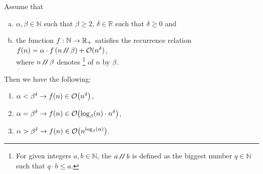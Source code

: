 \begin{Theorem} 
  Assume that 
  \begin{enumerate}[(a)]
  \item $\alpha,\beta \in \mathbb{N}$ such that  $\beta \geq 2$, $\delta \in \mathbb{R}$ such that $\delta \geq
    0$ and
  \item the function $f:{\mathbb N} \rightarrow {\mathbb R}_+$ satisfies the recurrence relation
        \\[0.2cm]
        \hspace*{1.3cm}
        $f(n) = \alpha \cdot f\left(n \mbox{\,\texttt{/}$\!$\texttt{/}\,} \beta\right) + \mathcal{O}(n^\delta)$,
        \\[0.2cm]
        where $n \mbox{\,\texttt{/}$\!$\texttt{/}\,} \beta$ denotes \footnote{
          For given integers $a, b \in \mathbb{N}$, the  $a \mbox{\,\texttt{/}$\!$\texttt{/}\,} b$
          is defined as the biggest number $q \in \mathbb{N}$ such that $q \cdot b \leq a$.  
        }  
        of $n$ by $\beta$.
  \end{enumerate}
  Then we have the following:
  \begin{enumerate}
  \item $\alpha < \beta^\delta\rightarrow f(n) \in \mathcal{O}\bigl(n^{\delta}\bigr)$,
  \item $\alpha = \beta^\delta\rightarrow f(n) \in \mathcal{O}\bigl(\log_\beta(n) \cdot n^{\delta}\bigr)$,
  \item $\alpha > \beta^{\delta} \rightarrow f(n) \in \mathcal{O}\bigl(n^{\log_{\beta}(\alpha)}\bigr)$. 
  \end{enumerate}
\end{Theorem}

